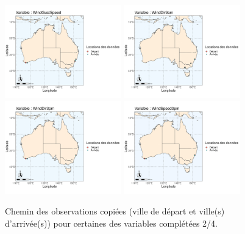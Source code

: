 \documentclass{article}
\begin{document}
\begin{figure}[htp]
    \centering
    \includegraphics[width=0.45\textwidth]{Images/Australia_map_segments_complete/Australia_map_segments_complete-05.png}
    \includegraphics[width=0.45\textwidth]{Images/Australia_map_segments_complete/Australia_map_segments_complete-06.png}
    \includegraphics[width=0.45\textwidth]{Images/Australia_map_segments_complete/Australia_map_segments_complete-07.png}
    \includegraphics[width=0.45\textwidth]{Images/Australia_map_segments_complete/Australia_map_segments_complete-08.png}
    \caption{Chemin des observations copiées (ville de départ et ville(s) d'arrivée(s)) pour certaines des variables complétées 2/4.}
    \label{fig:path_data2}
\end{figure}
\end{document}

